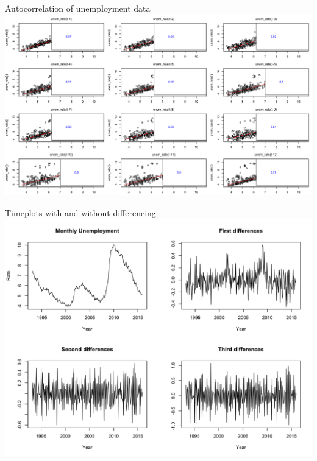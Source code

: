 \documentclass[ignorenonframetext]{beamer}
\begin{document}
\begin{frame}{Autocorrelation of unemployment data}
		\includegraphics[width=\linewidth]{images/laggedunemployment}
\end{frame}
 

  	\begin{frame}{Timeplots with and without differencing}
		\includegraphics[width=\linewidth]{images/seasonalunem}
  	\end{frame}
 
\end{document}

